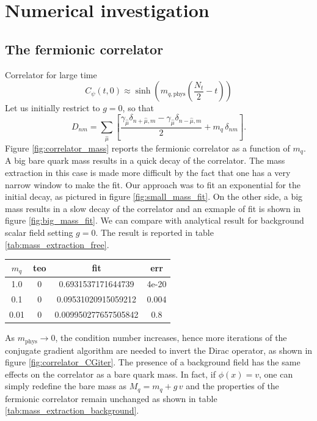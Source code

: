 \chapter{Numerical investigation}
\label{chapt:results}


\section{The fermionic correlator}
Correlator for large time
\begin{equation*}
    C_\psi(t,0) \approx \sinh \left(m_{q,\text{phys}} \left(\frac{N_t}{2} - t\right)\right)
\end{equation*}
Let us initially restrict to $g = 0$, so that
\begin{equation*}
    D_{n m}=\sum_{\hat\mu}\left[\frac{\gamma_{\hat\mu}\delta_{n+\hat\mu, m} - \gamma_{\hat\mu} \delta_{n-\hat\mu, m}}{2} + m_q \, \delta_{n m}\right] .
    \end{equation*}
Figure \ref{fig:correlator_mass} reports the fermionic correlator as a function of $m_q$. A big bare quark mass results in a quick decay of the correlator. The mass extraction in this case is made more difficult by the fact that one has a very narrow window to make the fit.
Our approach was to fit an exponential for the initial decay, as pictured in figure \ref{fig:small_mass_fit}. On the other side, a big mass results in a slow decay of the correlator and an exmaple of fit is shown in figure \ref{fig:big_mass_fit}. 
We can compare with analytical result for background scalar field setting $g=0$. The result is reported in table \ref{tab:mass_extraction_free}.
\begin{table}
    \centering
    \begin{tabular}[pos]{cccc}
        \toprule 
        $m_q$ & teo & fit & err \\
        \midrule 
        1.0 & 0 & 0.6931537171644739 & 4e-20 \\
        0.1 & 0 & 0.09531020915059212 & 0.004 \\
        0.01 & 0 & 0.009950277657505842 & 0.8 \\
        \bottomrule
    \end{tabular}
\end{table}
As $m_\text{phys} \to 0$, the condition number increases, hence more iterations of the conjugate gradient algorithm are needed to invert the Dirac operator, as shown in figure \ref{fig:correlator_CGiter}. 
The presence of a background field has the same effects on the correlator as a bare quark mass. In fact, if $\phi(x) = v$, one can simply redefine the bare mass as $M_q = m_q + g \, v$ and the properties of the fermionic correlator remain unchanged as shown in table \ref{tab:mass_extraction_background}.
